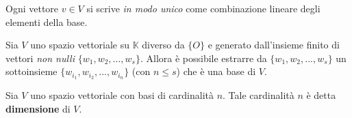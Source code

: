 \begin{proposition}
	Ogni vettore $v \in V$ si scrive \emph{in modo unico} come
	combinazione lineare degli elementi della base.
\end{proposition}

\begin{theorem}
	Sia $V$ uno spazio vettoriale su $\mathbb{K}$ diverso da $\{O\}$
	e generato dall'insieme finito di vettori \emph{non nulli}
	$\{w_1, w_2, ..., w_s\}$. Allora \`e possibile estrarre da
	$\{w_1, w_2, ..., w_s\}$ un sottoinsieme
	$\{w_{i_1}, w_{i_2}, ..., w_{i_n}\}$ (con $n \leq s$) che \`e
	una base di $V$.
\end{theorem}

\begin{defn}
	Sia $V$  uno spazio vettoriale con basi di cardinalit\`a $n$.
	Tale cardinalit\`a $n$ \`e detta \textbf{dimensione} di $V$.
\end{defn}
